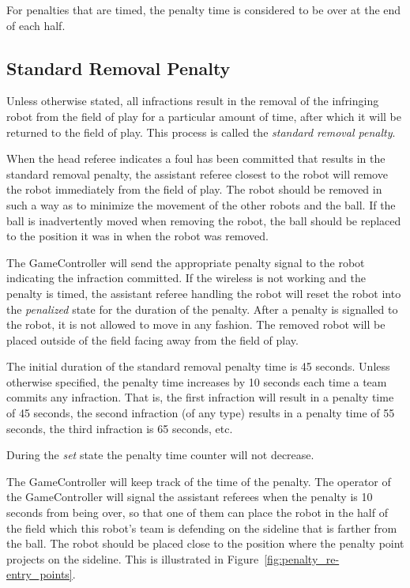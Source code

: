 \documentclass[12pt]{article}
\newcommand{\StandardPenaltyTime}{45 seconds\xspace}
\newcommand{\StandardPenaltyIncrease}{10 seconds\xspace}
\begin{document}
For penalties that are timed, the penalty time is considered to be over at the end of each half.

\subsection{Standard Removal Penalty}
\label{sec:removal_penalty}

Unless otherwise stated, all infractions result in the removal of the infringing robot from the field of play for a particular amount of time, after which it will be returned to the field of play. This process is called the \textit{standard removal penalty}.

When the head referee indicates a foul has been committed that results in the standard removal penalty, the assistant referee closest to the robot will remove the robot immediately from the field of play. The robot should be removed in such a way as to minimize the movement of the other robots and the ball. If the ball is inadvertently moved when removing the robot, the ball should be replaced to the position it was in when the robot was removed.

The GameController will send the appropriate penalty signal to the robot indicating the infraction committed. If the wireless is not working and the penalty is timed, the assistant referee handling the robot will reset the robot into the \emph{penalized} state for the duration of the penalty. After a penalty is signalled to the robot, it is not allowed to move in any fashion. The removed robot will be placed outside of the field facing away from the field of play.

The initial duration of the standard removal penalty time is \StandardPenaltyTime.
Unless otherwise specified, the penalty time increases by \StandardPenaltyIncrease each time a team commits any infraction.
That is, the first infraction will result in a penalty time of 45 seconds, the second infraction (of any type) results in a penalty time of 55 seconds, the third infraction is 65 seconds, etc.

During the \emph{set} state the penalty time counter will not decrease.

The GameController will keep track of the time of the penalty. The operator of the GameController will signal the assistant referees when the penalty is 10 seconds from being over, so that one of them can place the robot in the half of the field which this robot's team is defending on the sideline that is farther from the ball. The robot should be placed close to the position where the penalty point projects on the sideline. This is illustrated in Figure~\ref{fig:penalty_re-entry_points}.
\end{document}
